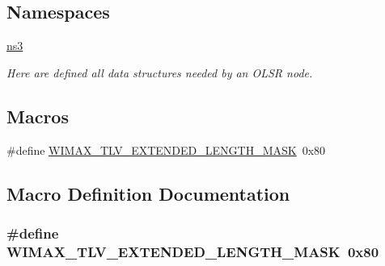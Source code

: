\subsection*{Namespaces}
\begin{DoxyCompactItemize}
\item 
 \hyperlink{namespacens3}{ns3}
\begin{DoxyCompactList}\small\item\em Here are defined all data structures needed by an O\+L\+SR node. \end{DoxyCompactList}\end{DoxyCompactItemize}
\subsection*{Macros}
\begin{DoxyCompactItemize}
\item 
\#define \hyperlink{wimax-tlv_8h_a590060b4cac40c59bb72398847174fae}{W\+I\+M\+A\+X\+\_\+\+T\+L\+V\+\_\+\+E\+X\+T\+E\+N\+D\+E\+D\+\_\+\+L\+E\+N\+G\+T\+H\+\_\+\+M\+A\+SK}~0x80
\end{DoxyCompactItemize}


\subsection{Macro Definition Documentation}
\subsubsection[{\texorpdfstring{W\+I\+M\+A\+X\+\_\+\+T\+L\+V\+\_\+\+E\+X\+T\+E\+N\+D\+E\+D\+\_\+\+L\+E\+N\+G\+T\+H\+\_\+\+M\+A\+SK}{WIMAX_TLV_EXTENDED_LENGTH_MASK}}]{\setlength{\rightskip}{0pt plus 5cm}\#define W\+I\+M\+A\+X\+\_\+\+T\+L\+V\+\_\+\+E\+X\+T\+E\+N\+D\+E\+D\+\_\+\+L\+E\+N\+G\+T\+H\+\_\+\+M\+A\+SK~0x80}\hypertarget{wimax-tlv_8h_a590060b4cac40c59bb72398847174fae}{}\label{wimax-tlv_8h_a590060b4cac40c59bb72398847174fae}
